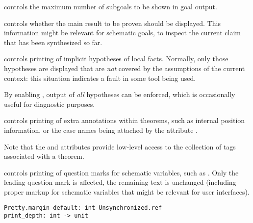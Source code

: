 \begin{isabellebody}
\begin{isamarkuptext}
\begin{description}
  \item \hyperlink{attribute.goals-limit}{\mbox{}} controls the maximum number of
  subgoals to be shown in goal output.

  \item \hyperlink{attribute.show-main-goal}{\mbox{}} controls whether the main result
  to be proven should be displayed.  This information might be
  relevant for schematic goals, to inspect the current claim that has
  been synthesized so far.

  \item \hyperlink{attribute.show-hyps}{\mbox{}} controls printing of implicit
  hypotheses of local facts.  Normally, only those hypotheses are
  displayed that are \emph{not} covered by the assumptions of the
  current context: this situation indicates a fault in some tool being
  used.

  By enabling \hyperlink{attribute.show-hyps}{\mbox{}}, output of \emph{all} hypotheses
  can be enforced, which is occasionally useful for diagnostic
  purposes.

  \item \hyperlink{attribute.show-tags}{\mbox{}} controls printing of extra annotations
  within theorems, such as internal position information, or the case
  names being attached by the attribute \hyperlink{attribute.case-names}{\mbox{}}.

  Note that the \hyperlink{attribute.tagged}{\mbox{}} and \hyperlink{attribute.untagged}{\mbox{}}
  attributes provide low-level access to the collection of tags
  associated with a theorem.

  \item \hyperlink{attribute.show-question-marks}{\mbox{}} controls printing of question
  marks for schematic variables, such as .  Only the leading
  question mark is affected, the remaining text is unchanged
  (including proper markup for schematic variables that might be
  relevant for user interfaces).

  \end{description}%
\end{isamarkuptext}%
\isamarkuptrue%
%
\isamarkuptrue%
%
\begin{isamarkuptext}%
\begin{mldecls}
    \verb|Pretty.margin_default: int Unsynchronized.ref| \\
    \verb|print_depth: int -> unit| \\
  \end{mldecls}


\end{isamarkuptext}
\end{isabellebody}
